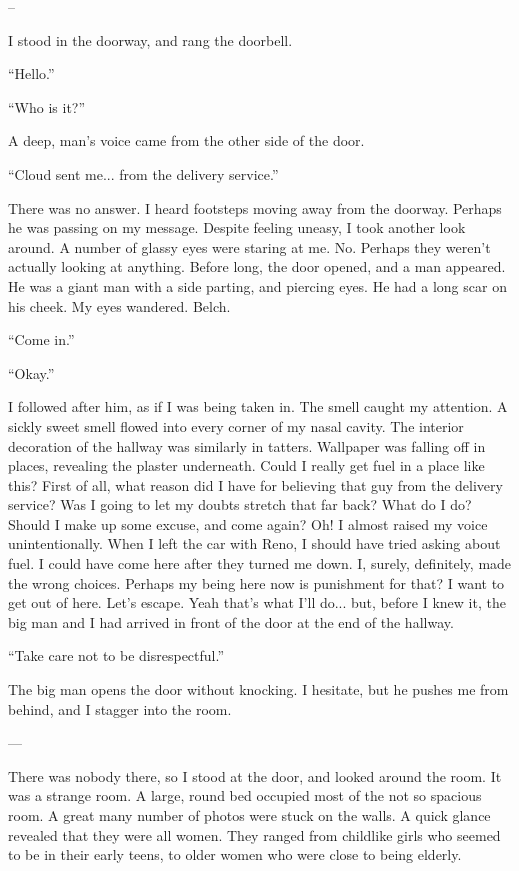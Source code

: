\documentclass[oneside]{book}
\begin{document}
–

I stood in the doorway, and rang the doorbell.

“Hello.”

“Who is it?”

A deep, man’s voice came from the other side of the door.

“Cloud sent me... from the delivery service.”

There was no answer. I heard footsteps moving away from the doorway. Perhaps he was passing on my message. Despite feeling uneasy, I took another look around. A number of glassy eyes were staring at me. No. Perhaps they weren’t actually looking at anything. Before long, the door opened, and a man appeared. He was a giant man with a side parting, and piercing eyes. He had a long scar on his cheek. My eyes wandered. Belch.

“Come in.”

“Okay.”

I followed after him, as if I was being taken in. The smell caught my attention. A sickly sweet smell flowed into every corner of my nasal cavity. The interior decoration of the hallway was similarly in tatters. Wallpaper was falling off in places, revealing the plaster underneath. Could I really get fuel in a place like this? First of all, what reason did I have for believing that guy from the delivery service? Was I going to let my doubts stretch that far back? What do I do? Should I make up some excuse, and come again? Oh! I almost raised my voice unintentionally. When I left the car with Reno, I should have tried asking about fuel. I could have come here after they turned me down. I, surely, definitely, made the wrong choices. Perhaps my being here now is punishment for that? I want to get out of here. Let’s escape. Yeah that’s what I’ll do... but, before I knew it, the big man and I had arrived in front of the door at the end of the hallway.

“Take care not to be disrespectful.”

The big man opens the door without knocking. I hesitate, but he pushes me from behind, and I stagger into the room.

—

There was nobody there, so I stood at the door, and looked around the room. It was a strange room. A large, round bed occupied most of the not so spacious room. A great many number of photos were stuck on the walls. A quick glance revealed that they were all women. They ranged from childlike girls who seemed to be in their early teens, to older women who were close to being elderly.
\end{document}
